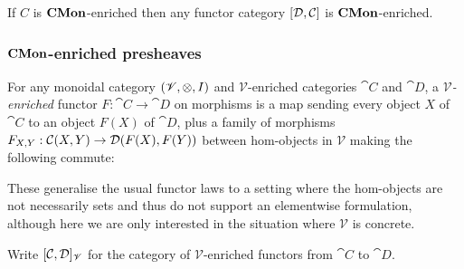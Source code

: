 \begin{proposition}
If $C$ is $\mathbf{CMon}$-enriched then any functor category $[\mathcal{D},\mathcal{C}]$ is $\mathbf{CMon}$-enriched.
\end{proposition}

\subsubsection{$\mathbf{CMon}$-enriched presheaves}

\begin{definition}
\label{def:cmon-enriched:enriched-functor}
For any monoidal category $(\mathscr{V}, \otimes, I)$ and $\mathscr{V}$-enriched categories $\cat{C}$ and
$\cat{D}$, a \emph{$\mathscr{V}$-enriched} functor $F: \cat{C} \to \cat{D}$ on morphisms is a map sending
every object $X$ of $\cat{C}$ to an object $F(X)$ of $\cat{D}$, plus a family of morphisms $F_{X,Y}:
{\mathcal{C}}(X,Y) \to {\mathcal{D}}(F(X),F(Y))$ between hom-objects in $\mathscr{V}$ making the
following commute:

\begin{center}
\hspace{5mm}
\end{center}
\end{definition}

\noindent These generalise the usual functor laws to a setting where the hom-objects are not necessarily sets
and thus do not support an elementwise formulation, although here we are only interested in the situation
where $\mathscr{V}$ is concrete.

\begin{definition}
Write $[\mathcal{C},\mathcal{D}]_{\mathscr{V}}$ for the category of $\mathscr{V}$-enriched functors from
$\cat{C}$ to $\cat{D}$.
\end{definition}

